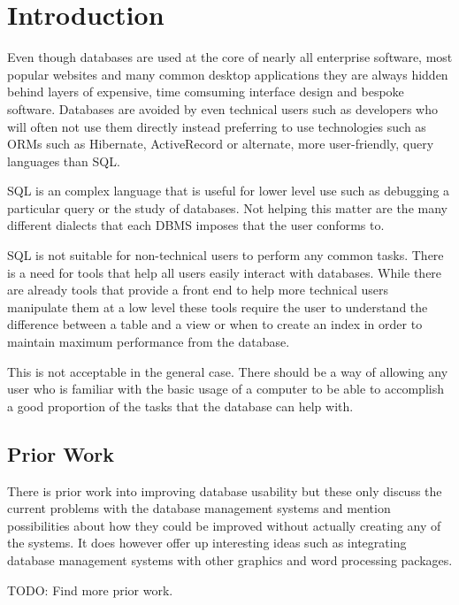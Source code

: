 \chapter{Introduction}

Even though databases are used at the core of nearly all enterprise software, most popular websites and many common desktop applications they are always hidden behind layers of expensive, time comsuming interface design and bespoke software. Databases are avoided by even technical users such as developers who will often not use them directly instead preferring to use technologies such as \acfp{ORM} such as Hibernate, ActiveRecord or alternate, more user-friendly, query languages than \ac{SQL}.

\ac{SQL} is an complex language that is useful for lower level use such as debugging a particular query or the study of databases. Not helping this matter are the many different dialects that each \ac{DBMS} imposes that the user conforms to.

\ac{SQL} is not suitable for non-technical users to perform any common tasks. There is a need for tools that help all users easily interact with databases. While there are already tools that provide a front end to help more technical users manipulate them at a low level these tools require the user to understand the difference between a table and a view or when to create an index in order to maintain maximum performance from the database.

This is not acceptable in the general case. There should be a way of allowing any user who is familiar with the basic usage of a computer to be able to accomplish a good proportion of the tasks that the database can help with.

\section{Prior Work}

There is prior work into improving database usability\cite{database-use, Jagadish2007} but these only discuss the current problems with the database management systems and mention possibilities about how they could be improved without actually creating any of the systems. It does however offer up interesting ideas such as integrating database management systems with other graphics and word processing packages.

TODO: Find more prior work.